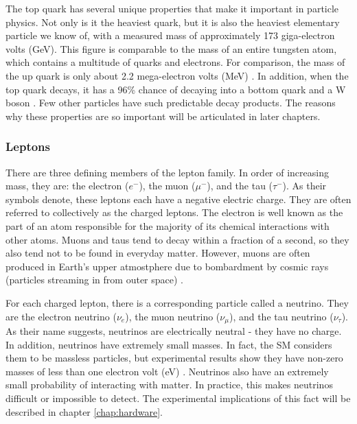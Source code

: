 The top quark has several unique properties that make it important
in particle physics. Not only is
it the heaviest quark, but it is also the heaviest elementary particle
we know of, with a measured mass of approximately 173 giga-electron
volts (GeV). This figure is comparable to the mass
of an entire tungsten atom, which contains a multitude of quarks and
electrons. For comparison, the mass of the up quark is only about
2.2 mega-electron volts (MeV) \cite{pdg}.
In addition, when the top quark decays, it has a 96\% chance of
decaying into a bottom quark and a W boson \cite{pdg}. Few other
particles have such predictable decay products. The reasons why these
properties are so important will be articulated in later chapters. %

\subsubsection*{Leptons}
There are three defining members of the lepton family. In order of
increasing mass, they are: the electron
($e^-$), the muon ($\mu^-$), and the tau ($\tau^-$). As their symbols
denote, these leptons each have a negative electric charge. They are
often referred to collectively as the charged leptons.
The electron is well known as the part of an atom responsible for the
majority of its chemical interactions with other atoms. Muons and taus
tend to decay within a fraction of a second, so they also tend not to
be found in everyday matter. However, muons are often produced in
Earth's upper atmostphere due to bombardment by cosmic rays (particles
streaming in from outer space) \cite{griffiths}.

For each charged lepton, there is a corresponding particle called a
neutrino. They are the electron neutrino ($\nu_e$), the muon
neutrino ($\nu_{\mu}$), and the tau neutrino ($\nu_{\tau}$). As their
name suggests, neutrinos are electrically neutral - they have no
charge. In addition, neutrinos have extremely small masses. In fact,
the SM considers them to be massless particles, but experimental
results show they have non-zero masses of less than one electron volt
(eV) \cite{pdg}. Neutrinos also have an extremely small probability of
interacting with matter. In practice, this makes neutrinos
difficult or impossible to detect. The experimental implications of
this fact will be described in chapter \ref{chap:hardware}. %

